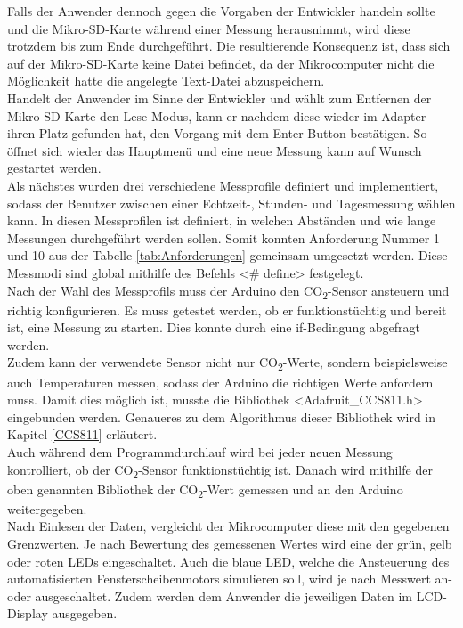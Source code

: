 Falls der Anwender dennoch gegen die Vorgaben der Entwickler handeln sollte und die Mikro-SD-Karte während einer Messung herausnimmt, wird diese trotzdem bis zum Ende durchgeführt. Die resultierende Konsequenz ist, dass sich auf der Mikro-SD-Karte keine Datei befindet, da der Mikrocomputer nicht die Möglichkeit hatte die angelegte Text-Datei abzuspeichern. \\
Handelt der Anwender im Sinne der Entwickler und wählt zum Entfernen der Mikro-SD-Karte den Lese-Modus, kann er nachdem diese wieder im Adapter ihren Platz gefunden hat, den Vorgang mit dem Enter-Button bestätigen. So öffnet sich wieder das Hauptmenü und eine neue Messung kann auf Wunsch gestartet werden. \\
Als nächstes wurden drei verschiedene Messprofile definiert und implementiert, sodass der Benutzer zwischen einer Echtzeit-, Stunden- und Tagesmessung wählen kann. In diesen Messprofilen ist definiert, in welchen Abständen und wie lange Messungen durchgeführt werden sollen. Somit konnten Anforderung Nummer 1 und 10 aus der Tabelle \ref{tab:Anforderungen} gemeinsam umgesetzt werden. Diese Messmodi sind global mithilfe des Befehls <\# define> festgelegt. \\
Nach der Wahl des Messprofils muss der Arduino den CO\textsubscript{2}-Sensor ansteuern und richtig konfigurieren. Es muss getestet werden, ob er funktionstüchtig und bereit ist, eine Messung zu starten. Dies konnte durch eine if-Bedingung abgefragt werden. \\
Zudem kann der verwendete Sensor nicht nur CO\textsubscript{2}-Werte, sondern beispielsweise auch Temperaturen messen, sodass der Arduino die richtigen Werte anfordern muss. Damit dies möglich ist, musste die Bibliothek <Adafruit\_CCS811.h> eingebunden werden. Genaueres zu dem Algorithmus dieser Bibliothek wird in Kapitel \ref{CCS811} erläutert. \\
Auch während dem Programmdurchlauf wird bei jeder neuen Messung kontrolliert, ob der CO\textsubscript{2}-Sensor funktionstüchtig ist. Danach wird mithilfe der oben genannten Bibliothek der CO\textsubscript{2}-Wert gemessen und an den Arduino weitergegeben. \\
Nach Einlesen der Daten, vergleicht der Mikrocomputer diese mit den gegebenen Grenzwerten. Je nach Bewertung des gemessenen Wertes wird eine der grün, gelb oder roten \ac{LED}s eingeschaltet. Auch die blaue \ac{LED}, welche die Ansteuerung des automatisierten Fensterscheibenmotors simulieren soll, wird je nach Messwert an- oder ausgeschaltet. Zudem werden dem Anwender die jeweiligen Daten im \ac{LCD}-Display ausgegeben. \\
